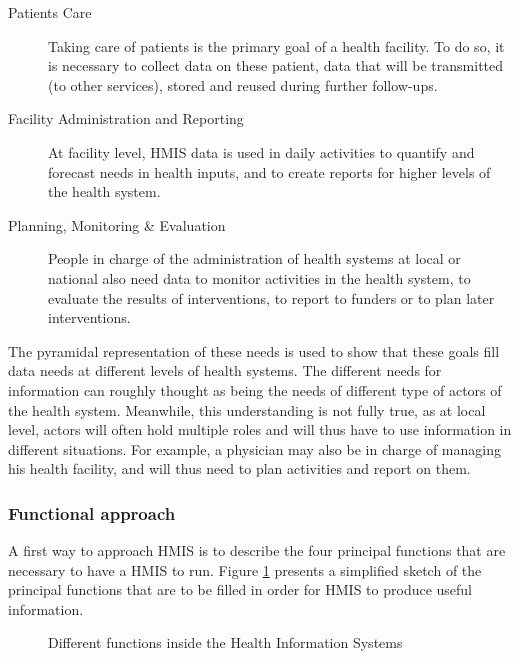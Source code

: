 \documentclass[a4paper,11pt,draft,twoside]{article}
\begin{document}
\begin{description}
\item[Patients Care] Taking care of patients is the primary goal of a health facility. To do so, it is necessary to collect data on these patient, data that will be transmitted (to other services), stored and reused during further follow-ups.
\item[Facility Administration and Reporting] At facility level, HMIS data is used in daily activities to quantify and forecast needs in health inputs, and to create reports for higher levels of the health system.
\item[Planning, Monitoring \& Evaluation] People in charge of the administration of health systems at local or national also need data to monitor activities in the health system, to evaluate the results of interventions, to report to funders or to plan later interventions.
\end{description}

The pyramidal representation of these needs is used to show that these goals fill data needs at different levels of health systems. The different needs for information can roughly thought as being the needs of different type of actors of the health system. Meanwhile, this understanding is not fully true, as at local level, actors will often hold multiple roles and will thus have to use information in different situations. For example, a physician may also be in charge of managing his health facility, and will thus need to plan activities and report on them.



	   \subsubsection{Functional approach}
	    \label{sec_function}

A first way to approach HMIS is to describe the four principal functions that are necessary to have a HMIS to run. Figure \ref{HMISFunctions} presents a simplified sketch of the principal functions that are to be filled in order for HMIS to produce useful information.

\begin{figure}[h]
\begin{center}
\end{center}
\caption{Different functions inside the Health Information Systems}
\label{HMISFunctions}
\end{figure}
\end{document}
